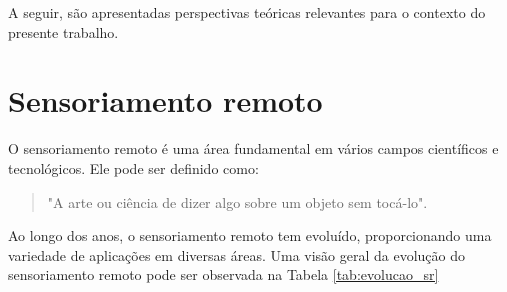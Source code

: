 A seguir, são apresentadas perspectivas teóricas relevantes para o contexto do presente
trabalho.
\section{Sensoriamento remoto}
O sensoriamento remoto é uma área fundamental em vários campos científicos e tecnológicos. Ele pode ser definido  como:
\begin{quote}
"A arte ou ciência de dizer algo sobre um objeto sem tocá-lo". \parencite[{p. 34}]{fischer1976}
\end{quote}

Ao longo dos anos, o sensoriamento remoto tem evoluído, proporcionando uma variedade de aplicações em diversas áreas. Uma visão geral da evolução do sensoriamento remoto pode ser observada na Tabela \ref{tab:evolucao_sr}

